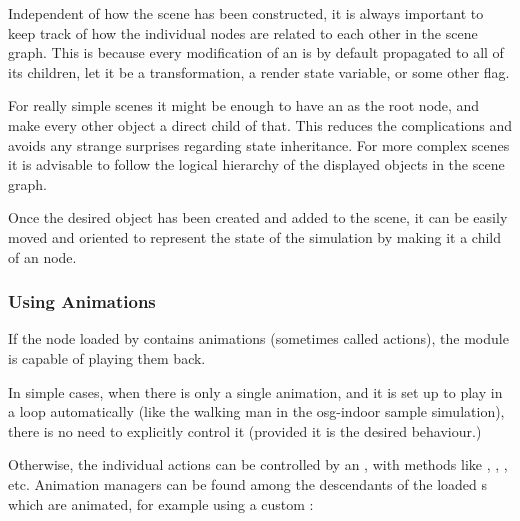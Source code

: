 Independent of how the scene has been constructed, it is always important
to keep track of how the individual nodes are related to each other in the
scene graph. This is because every modification of an  is by
default propagated to all of its children, let it be a transformation, a
render state variable, or some other flag.

For really simple scenes it might be enough to have an  as the
root node, and make every other object a direct child of that. This reduces
the complications and avoids any strange surprises regarding state
inheritance. For more complex scenes it is advisable to follow the logical
hierarchy of the displayed objects in the scene graph.

Once the desired object has been created and added to the scene, it can be easily
moved and oriented to represent the state of the simulation by making it a
child of an  node.

\subsubsection{Using Animations}

If the node loaded by  contains animations (sometimes called
actions), the  module is capable of playing them back.

In simple cases, when there is only a single animation, and it is set up to play
in a loop automatically (like the walking man in the osg-indoor sample simulation),
there is no need to explicitly control it (provided it is the desired behaviour.)

Otherwise, the individual actions can be controlled by an
, with methods like ,
, , etc. Animation managers can be
found among the descendants of the loaded s which are animated,
for example using a custom :


